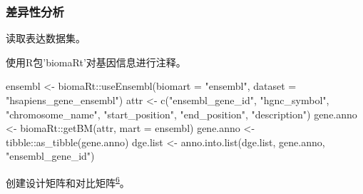 \documentclass[
]{article}
\newenvironment{Shaded}{\begin{snugshade}}{\end{snugshade}}
\newcommand{\AttributeTok}[1]{\textcolor[rgb]{0.77,0.63,0.00}{#1}}
\newcommand{\DecValTok}[1]{\textcolor[rgb]{0.00,0.00,0.81}{#1}}
\newcommand{\FunctionTok}[1]{\textcolor[rgb]{0.00,0.00,0.00}{#1}}
\newcommand{\NormalTok}[1]{#1}
\newcommand{\OtherTok}[1]{\textcolor[rgb]{0.56,0.35,0.01}{#1}}
\newcommand{\SpecialCharTok}[1]{\textcolor[rgb]{0.00,0.00,0.00}{#1}}
\newcommand{\StringTok}[1]{\textcolor[rgb]{0.31,0.60,0.02}{#1}}
\begin{document}
\hypertarget{diff}{%
\subsubsection{差异性分析}\label{diff}}

读取表达数据集。

\begin{Shaded}
\end{Shaded}

使用R包'biomaRt'对基因信息进行注释。

\begin{Shaded}
\begin{Highlighting}[]
\NormalTok{ensembl }\OtherTok{\textless{}{-}}\NormalTok{ biomaRt}\SpecialCharTok{::}\FunctionTok{useEnsembl}\NormalTok{(}\AttributeTok{biomart =} \StringTok{"ensembl"}\NormalTok{, }\AttributeTok{dataset =} \StringTok{"hsapiens\_gene\_ensembl"}\NormalTok{)}
\NormalTok{attr }\OtherTok{\textless{}{-}} \FunctionTok{c}\NormalTok{(}\StringTok{"ensembl\_gene\_id"}\NormalTok{, }\StringTok{"hgnc\_symbol"}\NormalTok{, }\StringTok{"chromosome\_name"}\NormalTok{,}
        \StringTok{"start\_position"}\NormalTok{, }\StringTok{"end\_position"}\NormalTok{, }\StringTok{"description"}\NormalTok{)}
\NormalTok{gene.anno }\OtherTok{\textless{}{-}}\NormalTok{ biomaRt}\SpecialCharTok{::}\FunctionTok{getBM}\NormalTok{(attr, }\AttributeTok{mart =}\NormalTok{ ensembl)}
\NormalTok{gene.anno }\OtherTok{\textless{}{-}}\NormalTok{ tibble}\SpecialCharTok{::}\FunctionTok{as\_tibble}\NormalTok{(gene.anno)}
\NormalTok{dge.list }\OtherTok{\textless{}{-}} \FunctionTok{anno.into.list}\NormalTok{(dge.list, gene.anno, }\StringTok{"ensembl\_gene\_id"}\NormalTok{)}
\end{Highlighting}
\end{Shaded}

创建设计矩阵和对比矩阵\textsuperscript{\protect\hyperlink{ref-law_guide_2020}{6}}。

\begin{Shaded}
\end{Shaded}
\end{document}
